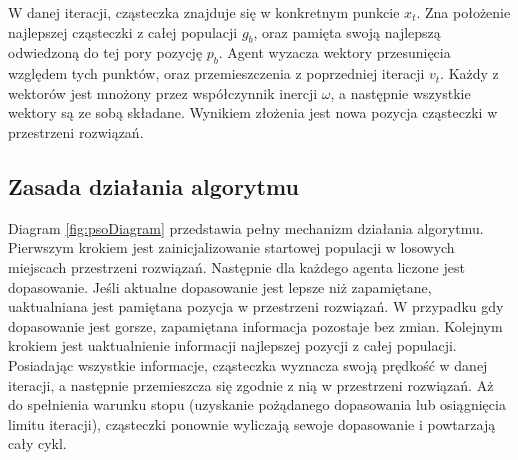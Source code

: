 W danej iteracji, cząsteczka znajduje się w konkretnym punkcie $x_t$. Zna położenie najlepszej cząsteczki z całej populacji $g_b$, oraz pamięta swoją najlepszą odwiedzoną do tej pory pozycję $p_b$. Agent wyzacza wektory przesunięcia względem tych punktów, oraz przemieszczenia z poprzedniej iteracji $v_t$. Każdy z wektorów jest mnożony przez współczynnik inercji $\omega$, a następnie wszystkie wektory są ze sobą składane. Wynikiem złożenia jest nowa pozycja cząsteczki w przestrzeni rozwiązań.

\subsection{Zasada działania algorytmu}
\label{sec:psoDzialanie}
Diagram \ref{fig:psoDiagram} przedstawia pełny mechanizm działania algorytmu. Pierwszym krokiem jest zainicjalizowanie startowej populacji w losowych miejscach przestrzeni rozwiązań. Następnie dla każdego agenta liczone jest dopasowanie. Jeśli aktualne dopasowanie jest lepsze niż zapamiętane, uaktualniana jest pamiętana pozycja w przestrzeni rozwiązań. W przypadku gdy dopasowanie jest gorsze, zapamiętana informacja pozostaje bez zmian. Kolejnym krokiem jest uaktualnienie informacji najlepszej pozycji z całej populacji. Posiadając wszystkie informacje, cząsteczka wyznacza swoją prędkość w danej iteracji, a następnie przemieszcza się zgodnie z nią w przestrzeni rozwiązań. Aż do spełnienia warunku stopu (uzyskanie pożądanego dopasowania lub osiągnięcia limitu iteracji), cząsteczki ponownie wyliczają sewoje dopasowanie i powtarzają cały cykl.

